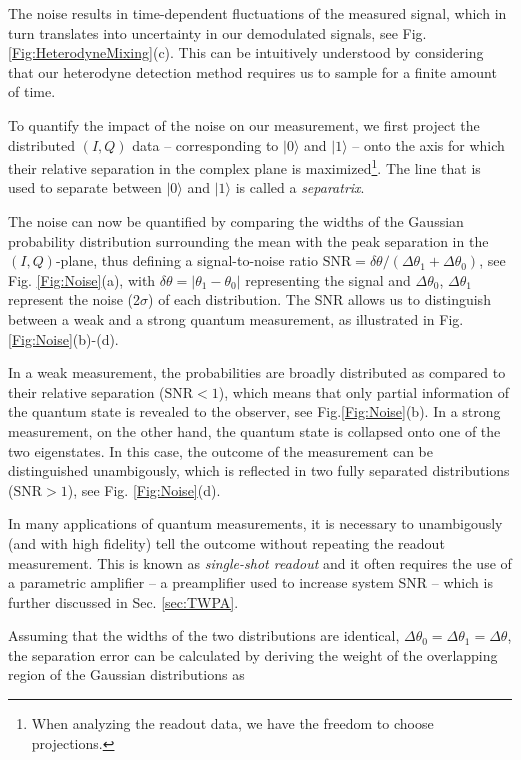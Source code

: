 \documentclass[aip,apr,twocolumn,showpacs,superscriptaddress,groupedaddress,nofootinbib,reprint]{revtex4-1}  %
\begin{document}
The noise results in time-dependent fluctuations of the measured signal, which in turn translates into uncertainty in our demodulated signals, see Fig. \ref{Fig:HeterodyneMixing}(c). This can be intuitively understood by considering that our heterodyne detection method requires us to sample for a finite amount of time.

To quantify the impact of the noise on our measurement, we first project the distributed $(I,Q)$ data -- corresponding to $|0\rangle$ and $|1\rangle$ -- onto the axis for which their relative separation in the complex plane is maximized\footnote{When analyzing the readout data, we have the freedom to choose projections.}. The line that is used to separate between $|0\rangle$ and $|1\rangle$ is called a \textit{separatrix}.

The noise can now be quantified by comparing the widths of the Gaussian probability distribution surrounding the mean with the peak separation in the $(I,Q)$-plane, thus defining a signal-to-noise ratio $\mbox{SNR} = \delta\theta/(\Delta\theta_{1} + \Delta\theta_{0})$, see Fig. \ref{Fig:Noise}(a), with $\delta\theta = |\theta_{1} - \theta_{0}|$ representing the signal and $\Delta\theta_0$, $\Delta\theta_1$ represent the noise (2$\sigma$) of each distribution. The SNR allows us to distinguish between a weak and a strong quantum measurement, as illustrated in Fig. \ref{Fig:Noise}(b)-(d).

In a weak measurement, the probabilities are broadly distributed as compared to their relative separation ($\mbox{SNR} < 1$), which means that only partial information of the quantum state is revealed to the observer, see Fig.\ref{Fig:Noise}(b). In a strong measurement, on the other hand, the quantum state is collapsed onto one of the two eigenstates. In this case, the outcome of the measurement can be distinguished unambigously, which is reflected in two fully separated distributions ($\mbox{SNR} > 1$), see Fig. \ref{Fig:Noise}(d).

In many applications of quantum measurements, it is necessary to unambigously (and with high fidelity) tell the outcome without repeating the readout measurement. This is known as \textit{single-shot readout} and it often requires the use of a parametric amplifier -- a preamplifier used to increase system SNR -- which is further discussed in Sec. \ref{sec:TWPA}.

Assuming that the widths of the two distributions are identical, $\Delta\theta_0 = \Delta\theta_1 = \Delta\theta$, the separation error can be calculated by deriving the weight of the overlapping region of the Gaussian distributions as\cite{SankPhD2014}
\end{document}
